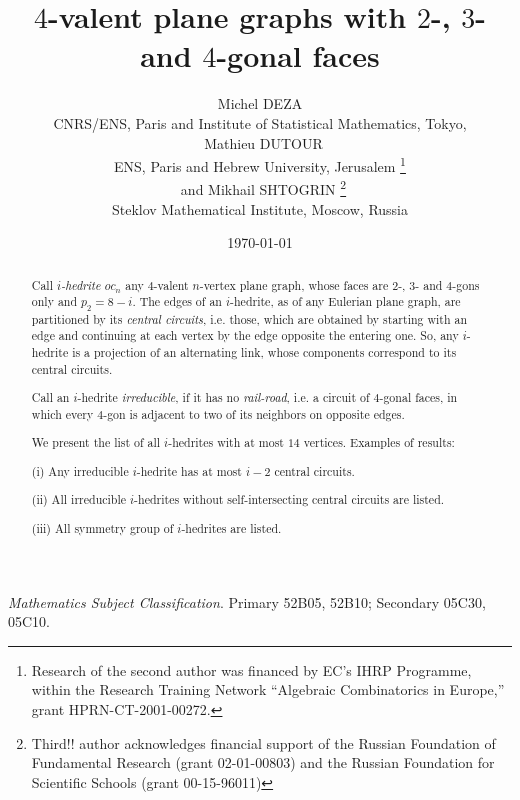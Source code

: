 \documentclass[12pt]{article}
\begin{document}
\title{$4$-valent plane graphs with $2$-, $3$- and $4$-gonal faces}


\author{Michel DEZA \\
  CNRS/ENS, Paris and Institute of Statistical Mathematics, 
Tokyo,\\
\ Mathieu DUTOUR \\
 ENS, Paris and Hebrew University, Jerusalem
\footnote{Research of the second author was financed by EC's IHRP Programme, within the Research Training Network ``Algebraic Combinatorics in Europe,'' grant HPRN-CT-2001-00272.}\\
\ and  Mikhail SHTOGRIN \thanks{Third!! author acknowledges financial support 
of the Russian Foundation of Fundamental Research (grant 02-01-00803)
and the Russian Foundation for Scientific Schools (grant 00-15-96011)}\\
Steklov Mathematical Institute, Moscow, Russia} 
\date{\today}

\maketitle



\begin{abstract}
Call {\em $i$-hedrite $oc_n$} any $4$-valent $n$-vertex plane graph, whose 
faces are $2$-, $3$- and $4$-gons only and $p_2=8-i$. The edges of an $i$-hedrite, as of 
any Eulerian plane graph, are partitioned
by its {\em central circuits}, i.e. those, which are obtained by starting with an
edge and continuing at each vertex by the edge opposite the entering one. 
So, any $i$-hedrite is a projection of an alternating link, whose components
correspond to its central circuits.

Call an $i$-hedrite {\em irreducible}, if it has no 
{\em rail-road}, i.e. a 
circuit of $4$-gonal faces, in which every $4$-gon is adjacent to two of its 
neighbors on opposite edges.

We present the list of all $i$-hedrites with at most $14$ vertices. Examples of results: 

(i) Any irreducible $i$-hedrite has at most $i-2$ central circuits.

(ii) All irreducible $i$-hedrites without self-intersecting central circuits are listed.

(iii) All symmetry group of $i$-hedrites are listed.

\end{abstract}

{\em Mathematics Subject Classification}. Primary 52B05, 52B10;
Secondary 05C30, 05C10.
\end{document}

